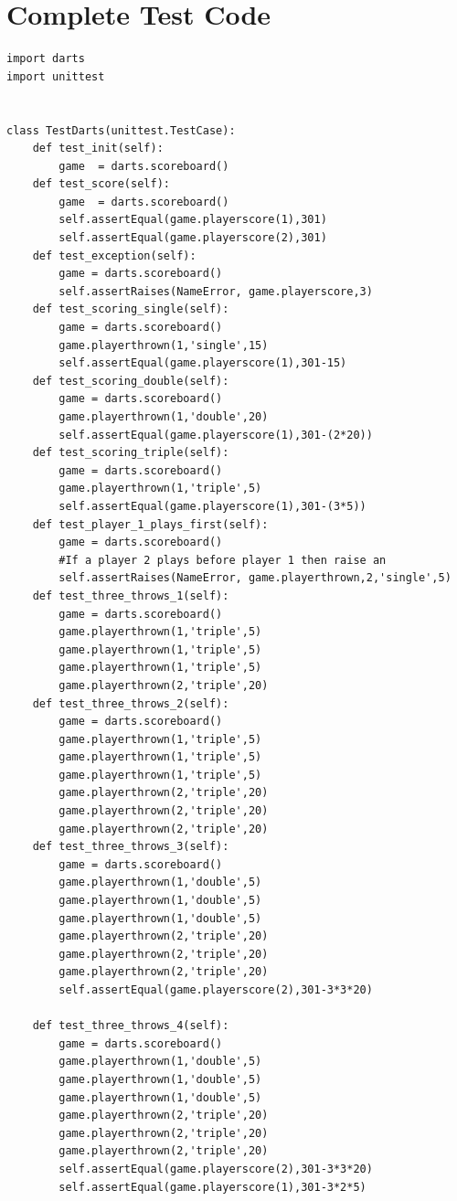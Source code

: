 \documentclass{paper}
\begin{document}
\section{Complete Test Code}
\begin{lstlisting}
import darts
import unittest


class TestDarts(unittest.TestCase):
    def test_init(self):
        game  = darts.scoreboard()
    def test_score(self):
        game  = darts.scoreboard()
        self.assertEqual(game.playerscore(1),301)
        self.assertEqual(game.playerscore(2),301)
    def test_exception(self):
        game = darts.scoreboard()
        self.assertRaises(NameError, game.playerscore,3)
    def test_scoring_single(self):
        game = darts.scoreboard()
        game.playerthrown(1,'single',15)
        self.assertEqual(game.playerscore(1),301-15)
    def test_scoring_double(self):
        game = darts.scoreboard()
        game.playerthrown(1,'double',20)
        self.assertEqual(game.playerscore(1),301-(2*20))
    def test_scoring_triple(self):
        game = darts.scoreboard()
        game.playerthrown(1,'triple',5)
        self.assertEqual(game.playerscore(1),301-(3*5))
    def test_player_1_plays_first(self):
        game = darts.scoreboard()
        #If a player 2 plays before player 1 then raise an 
        self.assertRaises(NameError, game.playerthrown,2,'single',5)
    def test_three_throws_1(self):
        game = darts.scoreboard()
        game.playerthrown(1,'triple',5)
        game.playerthrown(1,'triple',5)
        game.playerthrown(1,'triple',5)
        game.playerthrown(2,'triple',20)
    def test_three_throws_2(self):
        game = darts.scoreboard()
        game.playerthrown(1,'triple',5)
        game.playerthrown(1,'triple',5)
        game.playerthrown(1,'triple',5)
        game.playerthrown(2,'triple',20)
        game.playerthrown(2,'triple',20)
        game.playerthrown(2,'triple',20)
    def test_three_throws_3(self):
        game = darts.scoreboard()
        game.playerthrown(1,'double',5)
        game.playerthrown(1,'double',5)
        game.playerthrown(1,'double',5)
        game.playerthrown(2,'triple',20)
        game.playerthrown(2,'triple',20)
        game.playerthrown(2,'triple',20)
        self.assertEqual(game.playerscore(2),301-3*3*20)

    def test_three_throws_4(self):
        game = darts.scoreboard()
        game.playerthrown(1,'double',5)
        game.playerthrown(1,'double',5)
        game.playerthrown(1,'double',5)
        game.playerthrown(2,'triple',20)
        game.playerthrown(2,'triple',20)
        game.playerthrown(2,'triple',20)
        self.assertEqual(game.playerscore(2),301-3*3*20)
        self.assertEqual(game.playerscore(1),301-3*2*5)
        

\end{lstlisting}
\end{document}
